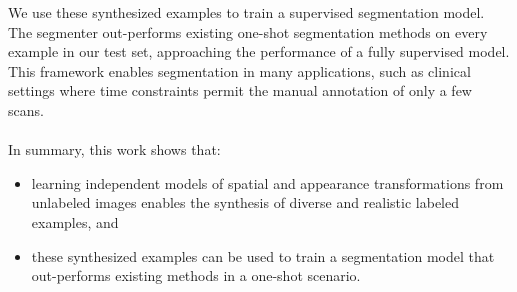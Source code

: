 \documentclass[10pt,twocolumn,letterpaper]{article}
\begin{document}
We use these synthesized examples to train a supervised segmentation model. The segmenter out-performs existing one-shot segmentation methods on every example in our test set, approaching the performance of a fully supervised model. This framework enables segmentation in many applications, such as clinical settings where time constraints permit the manual annotation of only a few scans. \\\\

\noindent In summary, this work shows that:
\begin{itemize}
\item learning independent models of spatial and appearance transformations from unlabeled images enables the synthesis of diverse and realistic labeled examples, and

\item these synthesized examples can be used to train a segmentation model that out-performs existing methods in a one-shot scenario.

\end{itemize}
 
{\small


}
\end{document}
